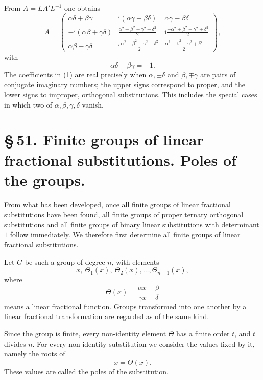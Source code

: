 \documentclass[11pt]{article}
\providecommand{\ii}{\mathrm{i}}
\begin{document}
From $A=LA'L^{-1}$ one obtains
\begin{equation}
A=\begin{pmatrix}
\alpha\delta+\beta\gamma & \ii(\alpha\gamma+\beta\delta) & \alpha\gamma-\beta\delta\\
-\ii(\alpha\beta+\gamma\delta)&\frac{\alpha^2+\beta^2+\gamma^2+\delta^2}{2}&\ii\frac{-\alpha^2+\beta^2-\gamma^2+\delta^2}{2}\\
\alpha\beta-\gamma\delta&\ii\frac{\alpha^2+\beta^2-\gamma^2-\delta^2}{2}&\frac{\alpha^2-\beta^2-\gamma^2+\delta^2}{2}
\end{pmatrix},
\tag{1}
\end{equation}
with
\begin{equation}
\alpha\delta-\beta\gamma=\pm1.
\tag{2}
\end{equation}
The coefficients in (1) are real precisely when $\alpha,\pm\delta$ and $\beta,\mp\gamma$ are pairs of conjugate imaginary numbers; the upper signs correspond to proper, and the lower signs to improper, orthogonal substitutions. This includes the special cases in which two of $\alpha,\beta,\gamma,\delta$ vanish.

\section*{\S\,51. Finite groups of linear fractional substitutions. Poles of the groups.}

From what has been developed, once all finite groups of linear fractional substitutions have been found, all finite groups of proper ternary orthogonal substitutions and all finite groups of binary linear substitutions with determinant $1$ follow immediately. We therefore first determine all finite groups of linear fractional substitutions.

Let $G$ be such a group of degree $n$, with elements
\begin{equation}
x,\ \Theta_1(x),\ \Theta_2(x),\ldots,\Theta_{n-1}(x),
\tag{1}
\end{equation}
where
\begin{equation}
\Theta(x)=\frac{\alpha x+\beta}{\gamma x+\delta}
\tag{2}
\end{equation}
means a linear fractional function. Groups transformed into one another by a linear fractional transformation are regarded as of the same kind.

Since the group is finite, every non-identity element $\Theta$ has a finite order $t$, and $t$ divides $n$. For every non-identity substitution we consider the values fixed by it, namely the roots of
\begin{equation}
x=\Theta(x).
\tag{5}
\end{equation}
These values are called the poles of the substitution.
\end{document}
